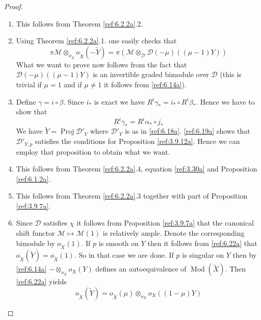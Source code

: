 \documentclass{amsproc}
\def\Dscr{{\mathcal D}}
\def\Mscr{{\mathcal M}}
\def\Nscr{{\mathcal N}}
\def\Gr{\mathop{\text{Gr}}}
\def\Proj{\operatorname {Proj}}
\def\Qch{\operatorname {Mod}}
\let\oldtext\text
\def\text#1{\oldtext{\upshape #1}}
\theoremstyle{definition}
\theoremstyle{remark}
\def\dirlim{\mathop{\vtop{\baselineskip -100pt\lineskip -1pt\lineskiplimit 0pt
\setbox0\hbox{\upshape lim}\copy0\hbox to \wd0{\rightarrowfill}}}\limits}
\numberwithin{equation}{section}
\numberwithin{table}{section}
\numberwithin{figure}{section}
\def\Gr{\mathop{\text{Gr}}}
\begin{document}
\begin{proof}
\begin{enumerate}
For use below we state the following 
formula for $\Nscr\in\Gr(\Dscr_Y)$.
\begin{equation}
\label{ref:6.21a}
\beta_\ast(\pi_Y\Nscr)=\dirlim \Nscr_n\otimes_{o_Y}
I^{\otimes{-n}}_{Y}
\end{equation}
We leave the easy proof to the reader.
\item This  follows from Theorem \ref{ref:6.2.2a}.2.
\item Using Theorem \ref{ref:6.2.2a}.1. one easily checks that
\begin{equation}
\label{ref:6.22a}
\pi \Mscr\otimes_{o_{\tilde{X}}} o_{\tilde{X}}(-{\tilde{Y}})= \pi(\Mscr \otimes_{\Dscr}
\Dscr(-\mu)((\mu-1)Y))
\end{equation}
What we want to prove now follows from the fact that
$\Dscr(-\mu)((\mu-1)Y)$ is an invertible graded bimodule over
$\Dscr$ (this is trivial if $\mu=1$ and if $\mu\neq 1$ it follows from
\eqref{ref:6.14a}). 
\item Define $\gamma=i\circ \beta$. Since $i_\ast$ is exact we have
  $R^i\gamma_\ast=i_\ast\circ R^i\beta_\ast$. Hence we have to show that
\begin{equation}
\label{ref:6.23a}
R^i\gamma_\ast=R^i\alpha_\ast\circ j_\ast
\end{equation}
 We have
  ${\tilde{Y}}=\Proj \Dscr'_{Y}$ where $\Dscr'_{Y}$ is as in
  \eqref{ref:6.18a}. \eqref{ref:6.19a} shows that
  $\Dscr'_{Y,p}$ satisfies the conditions for Proposition
  \ref{ref:3.9.12a}. Hence we can employ that proposition to obtain what we
  want.
\item This follows from Theorem \ref{ref:6.2.2a}.4, equation
  \eqref{ref:3.30a} and Proposition \ref{ref:6.1.2a}.
\item This follows from Theorem \ref{ref:6.2.2a}.3 together with
  part 
 of Proposition \ref{ref:3.9.7a}.
\item Since $\Dscr$ satisfies $\chi$ it follows from Proposition
\ref{ref:3.9.7a} that the canonical shift functor $\Mscr\mapsto \Mscr(1)$ is
relatively ample. Denote the corresponding bimodule by $o_{\tilde{X}}(1)$. If $p$ is
smooth on $Y$ then it follows from \eqref{ref:6.22a} that $o_{\tilde{X}}({\tilde{Y}})=o_{\tilde{X}}(1)$. So
in that case we are done. If $p$ is singular on $Y$ then by
\eqref{ref:6.14a}
 $-\otimes_{o_X} o_X(Y)$ defines an autoequivalence of $\Qch({\tilde{X}})$. Then \eqref{ref:6.22a} yields
\begin{equation}
\label{ref:6.24a}
o_{\tilde{X}}({\tilde{Y}})=o_{\tilde{X}}(\mu)\otimes_{o_X} o_X((1-\mu )Y)
\end{equation}

\end{enumerate}
\end{proof}
\end{document}
